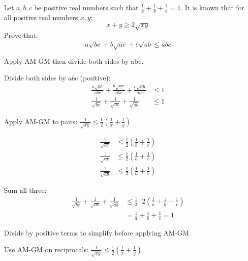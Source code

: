 \begin{problem}
Let $a, b, c$ be positive real numbers such that $\frac{1}{a}+\frac{1}{b}+\frac{1}{c}=1$. 
It is known that for all positive real numbers $x, y$:
\[ x+y \geq 2\sqrt{xy} \]
Prove that:
\[ a\sqrt{bc} + b\sqrt{ac} + c\sqrt{ab} \leq abc \]
\end{problem}

\begin{hint}
Apply AM-GM then divide both sides by abc.
\end{hint}

\begin{solution}
Divide both sides by $abc$ (positive):
\begin{align*}
\frac{a\sqrt{bc}}{abc} + \frac{b\sqrt{ac}}{abc} + \frac{c\sqrt{ab}}{abc} &\leq 1 \\
\frac{1}{\sqrt{bc}} + \frac{1}{\sqrt{ac}} + \frac{1}{\sqrt{ab}} &\leq 1
\end{align*}

Apply AM-GM to pairs: $\frac{1}{\sqrt{xy}} \leq \frac{1}{2}\left(\frac{1}{x} + \frac{1}{y}\right)$

\begin{align*}
\frac{1}{\sqrt{bc}} &\leq \frac{1}{2}\left(\frac{1}{b} + \frac{1}{c}\right) \\
\frac{1}{\sqrt{ac}} &\leq \frac{1}{2}\left(\frac{1}{a} + \frac{1}{c}\right) \\
\frac{1}{\sqrt{ab}} &\leq \frac{1}{2}\left(\frac{1}{a} + \frac{1}{b}\right)
\end{align*}

Sum all three:
\begin{align*}
\frac{1}{\sqrt{bc}} + \frac{1}{\sqrt{ac}} + \frac{1}{\sqrt{ab}} &\leq \frac{1}{2} \cdot 2\left(\frac{1}{a} + \frac{1}{b} + \frac{1}{c}\right) \\
&= \frac{1}{a} + \frac{1}{b} + \frac{1}{c} = 1
\end{align*}
\end{solution}

\begin{takeaways}
\item Divide by positive terms to simplify before applying AM-GM
\item Use AM-GM on reciprocals: $\frac{1}{\sqrt{xy}} \leq \frac{1}{2}(\frac{1}{x} + \frac{1}{y})$
\end{takeaways}
